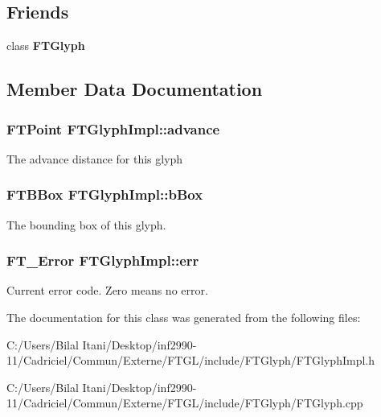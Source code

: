 \subsection*{Friends}
\begin{DoxyCompactItemize}
\item 
class {\bfseries F\+T\+Glyph}\hypertarget{class_f_t_glyph_impl_a908ad68576153727d761f276dd8fd0e2}{}\label{class_f_t_glyph_impl_a908ad68576153727d761f276dd8fd0e2}

\end{DoxyCompactItemize}


\subsection{Member Data Documentation}
\subsubsection[{\texorpdfstring{advance}{advance}}]{\setlength{\rightskip}{0pt plus 5cm}F\+T\+Point F\+T\+Glyph\+Impl\+::advance\hspace{0.3cm}{\ttfamily [protected]}}\hypertarget{class_f_t_glyph_impl_acd0a260e13ec1714c2556d24a5352a31}{}\label{class_f_t_glyph_impl_acd0a260e13ec1714c2556d24a5352a31}
The advance distance for this glyph 
\subsubsection[{\texorpdfstring{b\+Box}{bBox}}]{\setlength{\rightskip}{0pt plus 5cm}F\+T\+B\+Box F\+T\+Glyph\+Impl\+::b\+Box\hspace{0.3cm}{\ttfamily [protected]}}\hypertarget{class_f_t_glyph_impl_a871a6a1a24be465bfae17b7a8e464b3c}{}\label{class_f_t_glyph_impl_a871a6a1a24be465bfae17b7a8e464b3c}
The bounding box of this glyph. 
\subsubsection[{\texorpdfstring{err}{err}}]{\setlength{\rightskip}{0pt plus 5cm}F\+T\+\_\+\+Error F\+T\+Glyph\+Impl\+::err\hspace{0.3cm}{\ttfamily [protected]}}\hypertarget{class_f_t_glyph_impl_a7a489998b09aef9ceb733604166e933c}{}\label{class_f_t_glyph_impl_a7a489998b09aef9ceb733604166e933c}
Current error code. Zero means no error. 

The documentation for this class was generated from the following files\+:\begin{DoxyCompactItemize}
\item 
C\+:/\+Users/\+Bilal Itani/\+Desktop/inf2990-\/11/\+Cadriciel/\+Commun/\+Externe/\+F\+T\+G\+L/include/\+F\+T\+Glyph/F\+T\+Glyph\+Impl.\+h\item 
C\+:/\+Users/\+Bilal Itani/\+Desktop/inf2990-\/11/\+Cadriciel/\+Commun/\+Externe/\+F\+T\+G\+L/include/\+F\+T\+Glyph/F\+T\+Glyph.\+cpp\end{DoxyCompactItemize}
